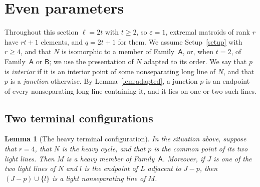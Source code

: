 \documentclass[11pt]{amsart}
\newtheorem{lemma}[theorem]{Lemma}
\theoremstyle{definition}
\theoremstyle{remark}
\numberwithin{equation}{section}
\newcommand{\FA}{\mathsf{A}}
\newcommand{\FB}{\mathsf{B}}
\begin{document}
\section{Even parameters}\label{sec:even}

Throughout this section $\ell=2t$ with $t\ge2$, so $\varepsilon=1$, extremal matroids of rank $r$ have $rt+1$ elements, and $q=2t+1$ for them. We assume Setup~\ref{setup} with $r\ge4$, and that $N$ is isomorphic to a member of Family~$\FA$, or, when $t=2$, of Family~$\FA$ or $\FB$; we use the presentation of $N$ adapted to its order. We say that $p$ is \emph{interior} if it is an interior point of some nonseparating long line of $N$, and that $p$ is a \emph{junction} otherwise. By Lemma~\ref{lem:adapted}, a junction $p$ is an endpoint of every nonseparating long line containing it, and it lies on one or two such lines.

\subsection{Two terminal configurations}

\begin{lemma}[The heavy terminal configuration]\label{lem:heavyterminal}
In the situation above, suppose that $r=4$, that $N$ is the heavy cycle, and that $p$ is the common point of its two light lines. Then $M$ is a heavy member of Family~$\FA$. Moreover, if $J$ is one of the two light lines of $N$ and $l$ is the endpoint of $L$ adjacent to $J-p$, then $(J-p)\cup\{l\}$ is a light nonseparating line of $M$.
\end{lemma}
\end{document}
